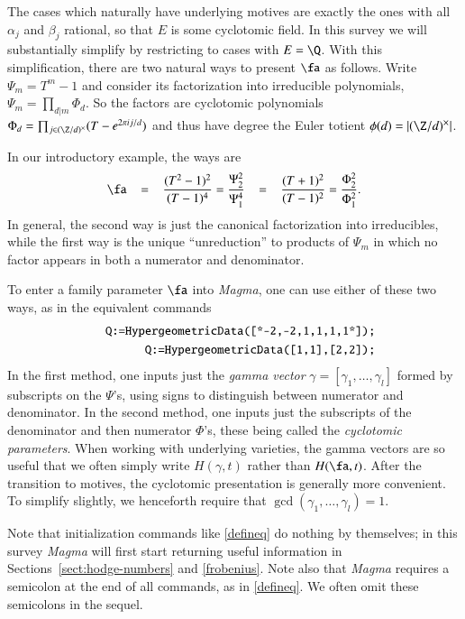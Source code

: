 \documentclass{notices}
\numberwithin{equation}{section}
\numberwithin{table}{section}
\numberwithin{figure}{section}
\begin{document}
    The cases which naturally have 
underlying motives are exactly the ones
with all $\alpha_j$ and $\beta_j$ rational,
so that $E$ is some cyclotomic field.  In
this survey we will substantially simplify by
restricting to cases with $E = \Q$.
With this simplification, there are two 
natural ways to present $\fa$ as follows.
Write $\Psi_m=T^m-1$ and consider 
its factorization into irreducible 
polynomials, $\Psi_m = \prod_{d|m} \Phi_d$. 
So the factors are cyclotomic polynomials
$\Phi_d = \prod_{j \in (\Z/d)^\times} (T - e^{2 \pi i j/d})$
and thus have degree the 
Euler totient $\phi(d) = |(\Z/d)^\times|$.   

In our introductory example, the ways are
\begin{equation}
\label{qphipsi}
\fa   \;\;\; = \;\;\; \frac{(T^2-1)^2}{(T-1)^4} = \frac{\Psi^2_2}{\Psi_1^4} \;\;\; =  \;\;\; \frac{(T+1)^2}{(T-1)^2} = \frac{\Phi^2_2}{\Phi_1^2}.
\end{equation}
In general, the second way is just the canonical factorization into irreducibles, while the first way is the unique ``unreduction'' to
products of $\Psi_m$ in which no factor appears in both a numerator and denominator.   


To enter a family parameter $\fa$ into {\em Magma}, one
can use either of these two ways, as in 
the equivalent commands
\begin{eqnarray}
&&\mbox{\tt Q:=HypergeometricData([*-2,-2,1,1,1,1*]);} \nonumber  \\ 
\label{defineq} &&\mbox{\tt Q:=HypergeometricData([1,1],[2,2]);} 
\end{eqnarray}
In the first method,  one
inputs just the {\em gamma vector} $\gamma = [\gamma_1,\dots,\gamma_l]$ formed by subscripts on the $\Psi$'s, 
using signs to distinguish between numerator and denominator.
In the second method, one inputs just the subscripts of the 
denominator and then numerator 
$\Phi$'s, 
these being called the {\em cyclotomic parameters}.  
When working with underlying varieties, the gamma vectors
are so useful that we often simply write $H(\gamma,t)$ rather than $H(\fa,t)$. After the transition to motives,
the cyclotomic presentation is generally more convenient.  To simplify
slightly, we henceforth require that $\gcd(\gamma_1,\dots,\gamma_l) = 1$.

Note that initialization commands like \eqref{defineq} do nothing by themselves;
in this survey {\em Magma} will first start returning useful information in 
Sections~\ref{sect:hodge-numbers} and \ref{frobenius}.   Note also that
{\em Magma} requires a semicolon at the end of all commands,
as in \eqref{defineq}.  We often omit these semicolons in the sequel.  
\end{document}
